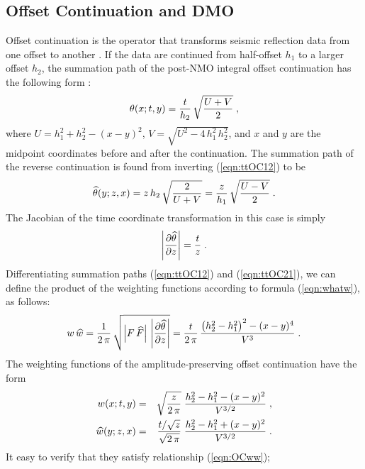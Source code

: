 \subsection{Offset Continuation and DMO}
Offset continuation is the operator that transforms seismic reflection
data from one offset to another
\cite[]{GPR30.06.08130828,GPR30.06.08290849}. If the data are continued
from half-offset $h_1$ to a larger offset $h_2$, the summation path of
the post-NMO integral offset continuation has the following form
\cite[]{Biondi.sep.80.125,stovas,Fomel.sepphd.107}:
\begin{equation}
\theta(x;t,y)  =  {t \over h_2}\,\sqrt{{U+V} \over 2}\;,
\label{eqn:ttOC12}
\end{equation}
where $U = h_1^2 + h_2^2 - (x - y)^2$, $V = \sqrt{U^2 -
4\,h_1^2\,h_2^2}$, and $x$ and $y$ are the midpoint coordinates before and
after the continuation. The summation path of the reverse continuation
is found from inverting (\ref{eqn:ttOC12}) to be
\begin{equation}
\widehat{\theta}(y;z,x)  =  {z \,h_2}\,\sqrt{2 \over {U+V}} = 
{z \over h_1}\,\sqrt{{U-V} \over 2}\;.
\label{eqn:ttOC21}
\end{equation}
The Jacobian of the time coordinate transformation in this case is simply
\begin{equation}
\left|\partial \widehat{\theta} \over \partial z\right| = {t \over z}\;.
\label{eqn:OCj}
\end{equation}
Differentiating summation paths (\ref{eqn:ttOC12}) and (\ref{eqn:ttOC21}), we
can define the product of the weighting functions according to formula
(\ref{eqn:whatw}), as follows:
\begin{equation}
w\,\widehat{w}={1\over{2\,\pi}} \, 
{\sqrt{\left|F\,\widehat{F}\right|\,
\left|\partial \widehat{\theta} \over \partial z\right|}} =
{t\over{2\,\pi}} \,{{\left(h_2^2-h_1^2\right)^2 - (x-y)^4} \over 
V^3}\;.
\label{eqn:OCww}
\end{equation}
The weighting functions of the amplitude-preserving offset
continuation have the form \cite[]{Fomel.sepphd.107}
\begin{eqnarray}
w(x;t,y) & = & \sqrt{z \over {2\,\pi}}\;
{{h_2^2-h_1^2-(x-y)^2} \over {V^{3/2}}}\;, 
\label{eqn:wOC12} \\
\widehat{w}(y;z,x) & = & {{t/\sqrt{z}} \over \sqrt{2\,\pi}}\;
{{h_2^2-h_1^2 + (x-y)^2} \over {V^{3/2}}}\;. 
\label{eqn:wOC21} 
\end{eqnarray}
It easy to verify that they satisfy relationship (\ref{eqn:OCww});

